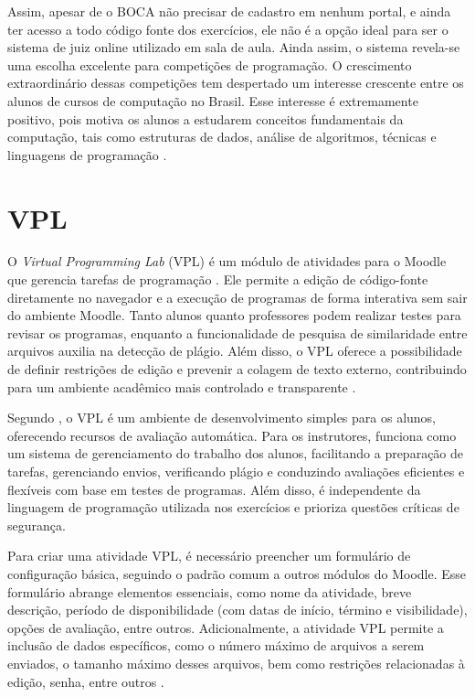 Assim, apesar de o BOCA não precisar de cadastro em nenhum portal, e ainda ter acesso a todo código fonte dos exercícios, ele não é a opção ideal para ser o sistema de juiz online utilizado em sala de aula. Ainda assim, o sistema revela-se uma escolha excelente para competições de programação. O crescimento extraordinário dessas competições tem despertado um interesse crescente entre os alunos de cursos de computação no Brasil. Esse interesse é extremamente positivo, pois motiva os alunos a estudarem conceitos fundamentais da computação, tais como estruturas de dados, análise de algoritmos, técnicas e linguagens de programação \cite[p.~11]{camposferreira}.

\section{VPL}

O \textit{Virtual Programming Lab} (VPL) é um módulo de atividades para o Moodle que gerencia tarefas de programação \cite{vpl}. Ele permite a edição de código-fonte diretamente no navegador e a execução de programas de forma interativa sem sair do ambiente Moodle. Tanto alunos quanto professores podem realizar testes para revisar os programas, enquanto a funcionalidade de pesquisa de similaridade entre arquivos auxilia na detecção de plágio. Além disso, o VPL oferece a possibilidade de definir restrições de edição e prevenir a colagem de texto externo, contribuindo para um ambiente acadêmico mais controlado e transparente \cite{vpl}.

Segundo \textcite[p.~1]{rodriguezdelpinoandroyo}, o VPL é um ambiente de desenvolvimento simples para os alunos, oferecendo recursos de avaliação automática. Para os instrutores, funciona como um sistema de gerenciamento do trabalho dos alunos, facilitando a preparação de tarefas, gerenciando envios, verificando plágio e conduzindo avaliações eficientes e flexíveis com base em testes de programas. Além disso, é independente da linguagem de programação utilizada nos exercícios e prioriza questões críticas de segurança.

Para criar uma atividade VPL, é necessário preencher um formulário de configuração básica, seguindo o padrão comum a outros módulos do Moodle. Esse formulário abrange elementos essenciais, como nome da atividade, breve descrição, período de disponibilidade (com datas de início, término e visibilidade), opções de avaliação, entre outros. Adicionalmente, a atividade VPL permite a inclusão de dados específicos, como o número máximo de arquivos a serem enviados, o tamanho máximo desses arquivos, bem como restrições relacionadas à edição, senha, entre outros \cite{vpl}.

